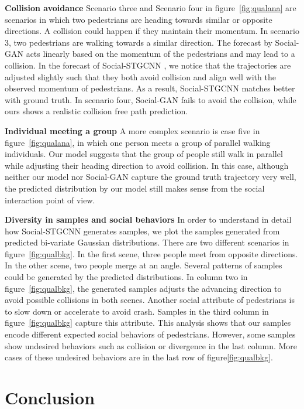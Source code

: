 \documentclass[10pt,twocolumn,letterpaper]{article}
\newcommand*{\ours}{Social-STGCNN }
\begin{document}
\noindent
\textbf{Collision avoidance} Scenario three and Scenario four in figure~\ref{fig:qualana} are scenarios in which two pedestrians are heading towards similar or opposite directions. A collision could happen if they maintain their momentum. In scenario 3, two pedestrians are walking towards a similar direction. The forecast by Social-GAN acts linearly based on the momentum of the pedestrians and may lead to a collision. In the forecast of \ours, we notice that the trajectories are adjusted slightly such that they both avoid collision and align well with the observed momentum of pedestrians. As a result, \ours matches better with ground truth. In scenario four, Social-GAN fails to avoid the collision, while ours shows a realistic collision free path prediction.

\noindent
\textbf{Individual meeting a group} A more complex scenario is case five in figure~\ref{fig:qualana}, in which one person meets a group of parallel walking individuals. Our model suggests that the group of people still walk in parallel while adjusting their heading direction to avoid collision. In this case, although neither our model nor Social-GAN capture the ground truth trajectory very well, the predicted distribution by our model still makes sense from the social interaction point of view.

\noindent
\textbf{Diversity in samples and social behaviors} In order to understand in detail how \ours generates samples, we plot the samples generated from predicted bi-variate Gaussian distributions. There are two different scenarios in figure~\ref{fig:qualbkg}. In the first scene, three people meet from opposite directions. In the other scene, two people merge at an angle. Several patterns of samples could be generated by the predicted distributions. In column two in figure~\ref{fig:qualbkg}, the generated samples adjusts the advancing direction to avoid possible collisions in both scenes. Another social attribute of pedestrians is to slow down or accelerate to avoid crash. Samples in the third column in figure~\ref{fig:qualbkg} capture this attribute. This analysis shows that our samples encode different expected social behaviors of pedestrians. However, some samples show undesired behaviors such as collision or divergence in the last column. More cases of these undesired behaviors are in the last row of figure\ref{fig:qualbkg}.

\section{Conclusion}
\label{sec:conclusion}
\end{document}
